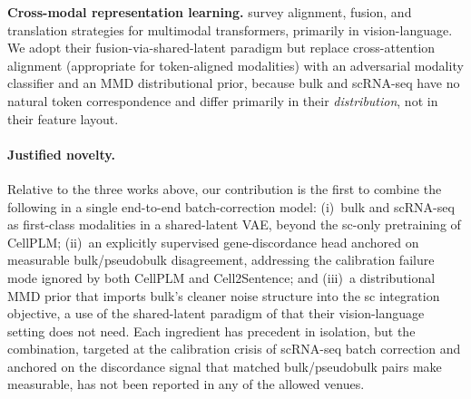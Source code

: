 \documentclass[11pt]{article}
\begin{document}
\textbf{Cross-modal representation learning.}
\citet{xu-etal-2023-mmt} survey alignment, fusion, and translation strategies
for multimodal transformers, primarily in vision-language. We adopt their
fusion-via-shared-latent paradigm but replace cross-attention alignment
(appropriate for token-aligned modalities) with an adversarial modality
classifier and an MMD distributional prior, because bulk and scRNA-seq have
no natural token correspondence and differ primarily in their
\emph{distribution}, not in their feature layout.

\paragraph{Justified novelty.}
Relative to the three works above, our contribution is the first to combine
the following in a single end-to-end batch-correction model: (i)~bulk and
scRNA-seq as first-class modalities in a shared-latent VAE, beyond the
sc-only pretraining of CellPLM; (ii)~an explicitly supervised gene-discordance
head anchored on measurable bulk/pseudobulk disagreement, addressing the
calibration failure mode ignored by both CellPLM and Cell2Sentence; and
(iii)~a distributional MMD prior that imports bulk's cleaner noise structure
into the sc integration objective, a use of the shared-latent paradigm of
\citet{xu-etal-2023-mmt} that their vision-language setting does not need.
Each ingredient has precedent in isolation, but the combination, targeted at
the calibration crisis of scRNA-seq batch correction and anchored on the
discordance signal that matched bulk/pseudobulk pairs make measurable, has
not been reported in any of the allowed venues.



\end{document}
